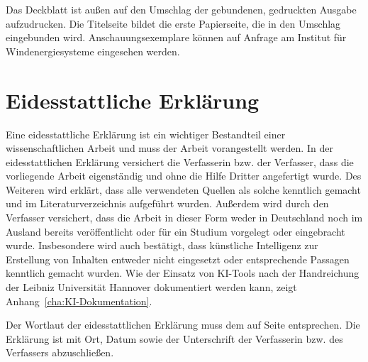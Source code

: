 Das Deckblatt ist außen auf den Umschlag der gebundenen, gedruckten Ausgabe aufzudrucken. Die Titelseite bildet die erste Papierseite, die in den Umschlag eingebunden wird. Anschauungsexemplare können auf Anfrage am Institut für Windenergiesysteme eingesehen werden.




\section{Eidesstattliche Erklärung}
\label{sec:Eid}

Eine eidesstattliche Erklärung ist ein wichtiger Bestandteil einer wissenschaftlichen Arbeit und muss der Arbeit vorangestellt werden. In der eidesstattlichen Erklärung versichert die Verfasserin bzw. der Verfasser, dass die vorliegende Arbeit eigenständig und ohne die Hilfe Dritter angefertigt wurde. Des Weiteren wird erklärt, dass alle verwendeten Quellen als solche kenntlich gemacht und im Literaturverzeichnis aufgeführt wurden. Außerdem wird durch den Verfasser versichert, dass die Arbeit in dieser Form weder in Deutschland noch im Ausland bereits veröffentlicht oder für ein Studium vorgelegt oder eingebracht wurde. Insbesondere wird auch bestätigt, dass künstliche Intelligenz zur Erstellung von Inhalten entweder nicht eingesetzt oder entsprechende Passagen kenntlich gemacht wurden. Wie der Einsatz von KI-Tools nach der Handreichung der Leibniz Universität Hannover dokumentiert werden kann, zeigt Anhang~\ref{cha:KI-Dokumentation}.

Der Wortlaut der eidesstattlichen Erklärung muss dem auf Seite \pageref{Erklaerung} entsprechen. Die Erklärung ist mit Ort, Datum sowie der Unterschrift der Verfasserin bzw. des Verfassers abzuschließen.

